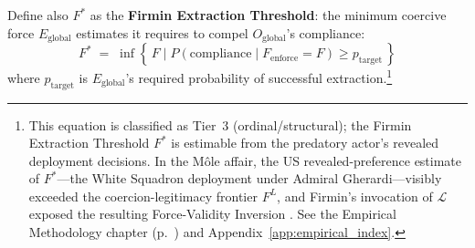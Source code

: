 Define also $F^*$ as the \textbf{Firmin Extraction Threshold}: the minimum coercive force $E_{\text{global}}$ estimates it requires to compel $O_{\text{global}}$'s compliance:
\begin{equation}\label{eq:13.8-firmin-extraction-threshold}
F^* \;=\; \inf\!\left\{\, F \;\Big|\; P(\text{compliance} \mid F_{\text{enforce}} = F) \geq p_{\text{target}} \,\right\}
\end{equation}
where $p_{\text{target}}$ is $E_{\text{global}}$'s required probability of successful extraction.\footnote{This equation is classified as Tier~3 (ordinal/structural); the Firmin Extraction Threshold $F^*$ is estimable from the predatory actor's revealed deployment decisions. In the M\^{o}le affair, the US revealed-preference estimate of $F^*$---the White Squadron deployment under Admiral Gherardi---visibly exceeded the coercion-legitimacy frontier $F^L$, and Firmin's invocation of $\mathcal{L}$ exposed the resulting Force-Validity Inversion \cite{firmin_legacy, manigat}. See the Empirical Methodology chapter (p.~\pageref{ch:empirical_methodology}) and Appendix~\ref{app:empirical_index}.}

